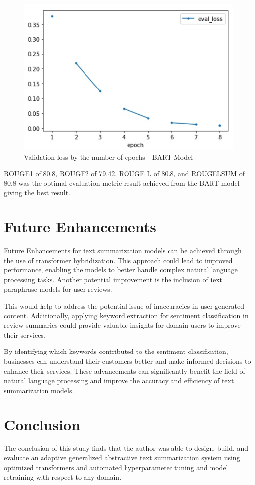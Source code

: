 \documentclass[conference]{IEEEtran}
\begin{document}
\begin{figure}[htbp]
\centerline{\includegraphics[width=\linewidth]{images/bart-model-validation-loss.jpg}}
\caption{Validation loss by the number of epochs - BART Model}
\label{fig:trait-content-output}
\end{figure}

ROUGE1 of 80.8, ROUGE2 of 79.42, ROUGE L of 80.8, and ROUGELSUM of 80.8 was the optimal evaluation metric result achieved from the BART model giving the best result.

\section{Future Enhancements}
Future Enhancements for text summarization models can be achieved through the use of transformer hybridization. This approach could lead to improved performance, enabling the models to better handle complex natural language processing tasks. Another potential improvement is the inclusion of text paraphrase models for user reviews. 

This would help to address the potential issue of inaccuracies in user-generated content. Additionally, applying keyword extraction for sentiment classification in review summaries could provide valuable insights for domain users to improve their services. 

By identifying which keywords contributed to the sentiment classification, businesses can understand their customers better and make informed decisions to enhance their services. These advancements can significantly benefit the field of natural language processing and improve the accuracy and efficiency of text summarization models.

\section{Conclusion}
The conclusion of this study finds that the author was able to design, build, and evaluate an adaptive generalized abstractive text summarization system using optimized transformers and automated hyperparameter tuning and model retraining with respect to any domain.


\printbibliography %
\end{document}
